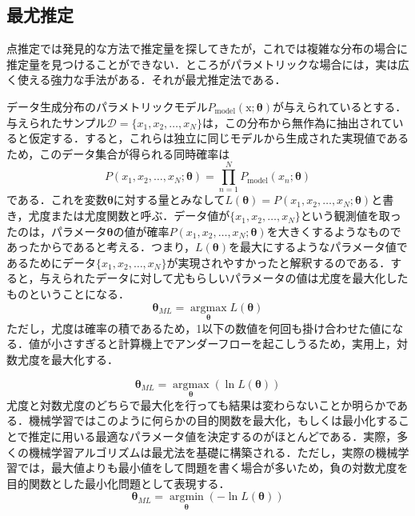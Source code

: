 \documentclass[a4paper,11pt]{jsreport}
\begin{document}
\subsection{最尤推定}
点推定では発見的な方法で推定量を探してきたが，これでは複雑な分布の場合に推定量を見つけることができない．ところがパラメトリックな場合には，実は広く使える強力な手法がある．それが最尤推定法である．\par
データ生成分布のパラメトリックモデル$P_{\text{model}}(\mathrm{x}; \bm{\theta})$が与えられているとする．与えられたサンプル$\mathcal{D} = \{x_1, x_2, \dots, x_N\}$は，この分布から無作為に抽出されていると仮定する．すると，これらは独立に同じモデルから生成された実現値であるため，このデータ集合が得られる同時確率は
\begin{equation*}
  P(x_1, x_2, \dots, x_N; \bm{\theta}) 
  = \prod_{n=1}^N P_{\text{model}}(x_n; \bm{\theta})
\end{equation*}
である．これを変数$\bm{\theta}$に対する量とみなして$L(\bm{\theta}) = P(x_1, x_2, \dots, x_N; \bm{\theta})$と書き，尤度または尤度関数と呼ぶ．データ値が$\{ x_1, x_2, \dots, x_N \}$という観測値を取ったのは，パラメータ$\bm{\theta}$の値が確率$P(x_1, x_2, \dots, x_N; \bm{\theta})$を大きくするようなものであったからであると考える．つまり，$L(\bm{\theta})$を最大にするようなパラメータ値であるためにデータ$\{ x_1, x_2, \dots, x_N \}$が実現されやすかったと解釈するのである．すると，与えられたデータに対して尤もらしいパラメータの値は尤度を最大化したものということになる．
\begin{equation}
  \bm{\theta}_{ML} = \underset{\bm{\theta}} {\operatorname{argmax}} L(\bm{\theta})
\end{equation}
ただし，尤度は確率の積であるため，1以下の数値を何回も掛け合わせた値になる．値が小さすぎると計算機上でアンダーフローを起こしうるため，実用上，対数尤度を最大化する．\par
\begin{equation}
  \bm{\theta}_{ML} = \underset{\bm{\theta}} {\operatorname{argmax}} (\ln{L(\bm{\theta})})
\end{equation}
尤度と対数尤度のどちらで最大化を行っても結果は変わらないことか明らかである．機械学習ではこのように何らかの目的関数を最大化，もしくは最小化することで推定に用いる最適なパラメータ値を決定するのがほとんどである．実際，多くの機械学習アルゴリズムは最尤法を基礎に構築される．ただし，実際の機械学習では，最大値よりも最小値をして問題を書く場合が多いため，負の対数尤度を目的関数とした最小化問題として表現する．
\begin{equation}
  \bm{\theta}_{ML} = \underset{\bm{\theta}} {\operatorname{argmin}} (-\ln{L(\bm{\theta})})
\end{equation}
\end{document}
